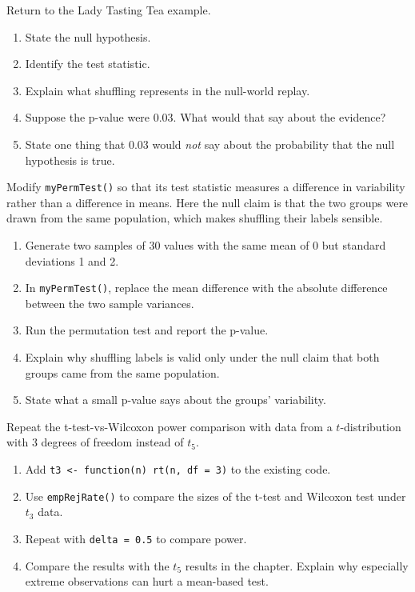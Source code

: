 \begin{exercise}
Return to the Lady Tasting Tea example.
\begin{enumerate}[label=(\alph*)]
\item State the null hypothesis.
\item Identify the test statistic.
\item Explain what shuffling represents in the null-world replay.
\item Suppose the p-value were 0.03. What would that say about the
  evidence?
\item State one thing that 0.03 would \emph{not} say about the
  probability that the null hypothesis is true.
\end{enumerate}
\end{exercise}

\begin{exercise}
Modify \lstinline{myPermTest()} so that its test statistic measures a
difference in variability rather than a difference in means. Here the
null claim is that the two groups were drawn from the same population,
which makes shuffling their labels sensible.
\begin{enumerate}[label=(\alph*)]
\item Generate two samples of 30 values with the same mean of 0 but
  standard deviations 1 and 2.
\item In \lstinline{myPermTest()}, replace the mean difference with the
  absolute difference between the two sample variances.
\item Run the permutation test and report the p-value.
\item Explain why shuffling labels is valid only under the null claim
  that both groups came from the same population.
\item State what a small p-value says about the groups' variability.
\end{enumerate}
\end{exercise}

\begin{exercise}
Repeat the t-test-vs-Wilcoxon power comparison with data from a
$t$-distribution with 3 degrees of freedom instead of $t_5$.
\begin{enumerate}[label=(\alph*)]
\item Add \lstinline{t3 <- function(n) rt(n, df = 3)} to the existing
  code.
\item Use \lstinline{empRejRate()} to compare the sizes of the t-test
  and Wilcoxon test under $t_3$ data.
\item Repeat with \lstinline{delta = 0.5} to compare power.
\item Compare the results with the $t_5$ results in the chapter. Explain
  why especially extreme observations can hurt a mean-based test.
\end{enumerate}
\end{exercise}

